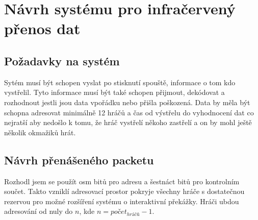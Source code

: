 \chapter{Návrh systému pro infračervený přenos dat}

\section{Požadavky na systém}
Sytém musí být schopen vyslat po stisknutí spouště, informace o tom kdo vystřelil. Tyto informace musí být také schopen přijmout, dekódovat a rozhodnout jestli jsou data vpořádku nebo přišla poškozená. Data by měla být schopna adresovat minimálně 12 hráčů a čas od výstřelu do vyhodnocení dat co nejratší aby nedošlo k tomu, že hráč vystřelí někoho zastřelí a on by mohl ještě několik okmažiků hrát.

\section{Návrh přenášeného packetu}
Rozhodl jsem se použít osm bitů pro adresu a šestnáct bitů pro kontrolním součet. Takto vzniklí adresovací prostor pokryje všechny hráče s dostatečnou rezervou pro možné rozšíření systému o interaktivní překážky. Hráči ubdou adresování od nuly do $n$, kde $n = počet _{hráčů} - 1$.

